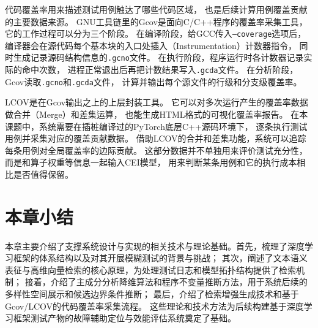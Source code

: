 代码覆盖率用来描述测试用例触达了哪些代码区域，
也是后续计算用例覆盖贡献的主要数据来源\cite{ref_coverage_survey}。
GNU工具链里的Gcov\cite{ref_gcov}是面向C/C++程序的覆盖率采集工具，
它的工作过程可以分为三个阶段。
在编译阶段，给GCC传入\texttt{--coverage}选项后，
编译器会在源代码每个基本块的入口处插入（Instrumentation）计数器指令，
同时生成记录源码结构信息的\texttt{.gcno}文件。
在执行阶段，程序运行时各计数器记录实际的命中次数，
进程正常退出后再把计数结果写入\texttt{.gcda}文件。
在分析阶段，Gcov读取\texttt{.gcno}和\texttt{.gcda}文件，
计算并输出每个源文件的行级和分支级覆盖率。

LCOV\cite{ref_lcov}是在Gcov输出之上的上层封装工具。
它可以对多次运行产生的覆盖率数据做合并（Merge）和差集运算，
也能生成HTML格式的可视化覆盖率报告。
在本课题中，系统需要在插桩编译过的PyTorch底层C++源码环境下，
逐条执行测试用例并采集对应的覆盖贡献数据。
借助LCOV的合并和差集功能，系统可以追踪每条用例对全局覆盖率的边际贡献。
这部分数据并不单独用来评价测试充分性，
而是和算子权重等信息一起输入CEI模型，
用来判断某条用例和它的执行成本相比是否值得保留。

\section{本章小结}

本章主要介绍了支撑系统设计与实现的相关技术与理论基础。首先，梳理了深度学习框架的体系结构以及对其开展模糊测试的背景与挑战；
其次，阐述了文本语义表征与高维向量检索的核心原理，为处理测试日志和模型拓扑结构提供了检索机制；
接着，介绍了主成分分析降维算法和程序不变量推断方法，用于系统后续的多样性空间展示和候选边界条件推断；
最后，介绍了检索增强生成技术和基于Gcov/LCOV的代码覆盖率采集流程。
这些理论和技术方法为后续构建基于深度学习框架测试产物的故障辅助定位与效能评估系统奠定了基础。